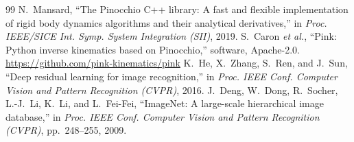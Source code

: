 \documentclass[conference,10pt]{IEEEtran}
\begin{document}
\begin{thebibliography}{99}
N.~Mansard, ``The Pinocchio C++ library: A fast and flexible implementation of rigid body dynamics algorithms and their
analytical derivatives,'' in \emph{Proc. IEEE/SICE Int. Symp. System Integration (SII)}, 2019.
 S.~Caron \emph{et al.}, ``Pink: Python inverse kinematics based on Pinocchio,'' software, Apache-2.0.
\url{https://github.com/pink-kinematics/pink}
 K.~He, X.~Zhang, S.~Ren, and J.~Sun, ``Deep residual learning for image recognition,'' in
\emph{Proc. IEEE Conf. Computer Vision and Pattern Recognition (CVPR)}, 2016.
 J.~Deng, W.~Dong, R.~Socher, L.-J.~Li, K.~Li, and L.~Fei-Fei, ``ImageNet: A large-scale
hierarchical image database,'' in \emph{Proc. IEEE Conf. Computer Vision and Pattern Recognition (CVPR)}, pp.~248--255, 2009.
\end{thebibliography}
\end{document}
